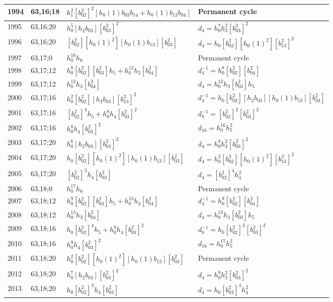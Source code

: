 \documentclass{article}
\begin{document}
\begin{longtable}{|l|l|>{\raggedright\arraybackslash}p{6cm}|>{\raggedright\arraybackslash}p{6cm}|}
\hline
1994 & 63,16;18 & $h_1^2[b_{02}^2]^2[h_0(1)b_{03}b_{14} + h_0(1)b_{13}b_{04}]$ & Permanent cycle\\
\hline
1995 & 63,16;20 & $h_0^5[h_2b_{03}][b_{03}^2]^2$ &$d_{4}=h_0^7h_3^2[b_{03}^2]^2$\\
1996 & 63,16;20 & $[b_{02}^2][h_0(1)^2][h_0(1)b_{13}][b_{03}^2]$ &$d_{4}=h_0[b_{02}^2][h_0(1)^2][b_{13}^2]^2$\\
\hline
1997 & 63,17;0 & $h_0^{16}h_6$ & Permanent cycle\\
\hline
1998 & 63,17;12 & $h_0^8[b_{02}^2][b_{03}^2]h_5 + h_0^{12}h_3[b_{04}^2]$ & $d_{4}^{-1}=h_0^8[b_{02}^2][b_{04}^2]$\\
1999 & 63,17;12 & $h_0^{12}h_3[b_{04}^2]$ &$d_{4}=h_0^{12}h_3[b_{03}^2]h_5$\\
\hline
2000 & 63,17;16 & $h_0^2[b_{02}^2][h_2b_{03}][b_{13}^2]^2$ & $d_{4}^{-1}=h_0[b_{02}^2][h_2b_{03}][h_0(1)b_{13}][b_{03}^2]$\\
2001 & 63,17;16 & $[b_{02}^2]^4h_5 + h_0^8h_4[b_{03}^2]^2$ & $d_{8}^{-1}=[b_{02}^2]^2[b_{03}^2]^2$\\
2002 & 63,17;16 & $h_0^8h_4[b_{03}^2]^2$ &$d_{16}=h_0^{16}h_5^2$\\
\hline
2003 & 63,17;20 & $h_0^6[h_2b_{03}][b_{03}^2]^2$ &$d_{4}=h_0^8h_3^2[b_{03}^2]^2$\\
2004 & 63,17;20 & $h_0[b_{02}^2][h_0(1)^2][h_0(1)b_{13}][b_{03}^2]$ &$d_{4}=h_0^2[b_{02}^2][h_0(1)^2][b_{13}^2]^2$\\
2005 & 63,17;20 & $[b_{02}^2]^3h_4[b_{03}^2]$ &$d_{4}=[b_{02}^2]^4h_4^2$\\
\hline
2006 & 63,18;0 & $h_0^{17}h_6$ & Permanent cycle\\
\hline
2007 & 63,18;12 & $h_0^9[b_{02}^2][b_{03}^2]h_5 + h_0^{13}h_3[b_{04}^2]$ & $d_{4}^{-1}=h_0^9[b_{02}^2][b_{04}^2]$\\
2008 & 63,18;12 & $h_0^{13}h_3[b_{04}^2]$ &$d_{4}=h_0^{13}h_3[b_{03}^2]h_5$\\
\hline
2009 & 63,18;16 & $h_0[b_{02}^2]^4h_5 + h_0^9h_4[b_{03}^2]^2$ & $d_{8}^{-1}=h_0[b_{02}^2]^2[b_{03}^2]^2$\\
2010 & 63,18;16 & $h_0^9h_4[b_{03}^2]^2$ &$d_{16}=h_0^{17}h_5^2$\\
\hline
2011 & 63,18;20 & $h_0^2[b_{02}^2][h_0(1)^2][h_0(1)b_{13}][b_{03}^2]$ & Permanent cycle\\
2012 & 63,18;20 & $h_0^7[h_2b_{03}][b_{03}^2]^2$ &$d_{4}=h_0^9h_3^2[b_{03}^2]^2$\\
2013 & 63,18;20 & $h_0[b_{02}^2]^3h_4[b_{03}^2]$ &$d_{4}=h_0[b_{02}^2]^4h_4^2$\\

\end{longtable}
\end{document}
